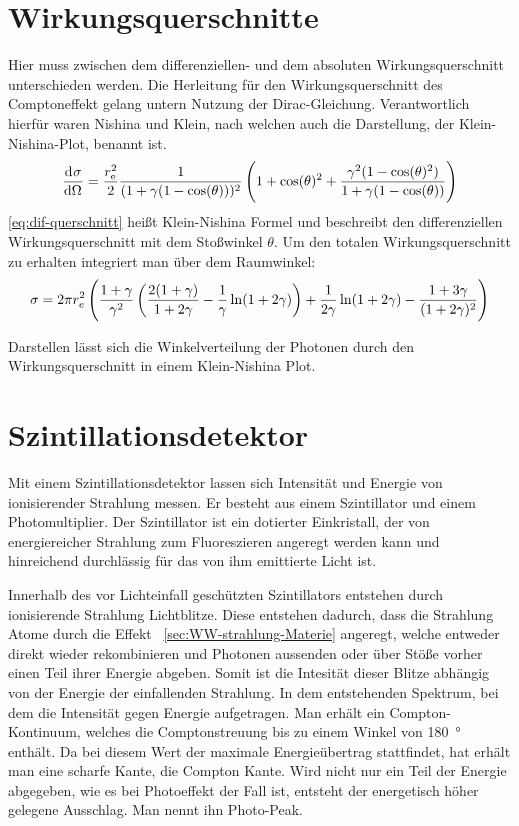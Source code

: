 \documentclass[11pt, ngerman, fleqn, DIV=15, headinclude, BCOR=2cm]{scrreprt}
\begin{document}
\section{Wirkungsquerschnitte}
Hier muss zwischen dem differenziellen- und dem absoluten Wirkungsquerschnitt
unterschieden werden.
Die Herleitung für den Wirkungsquerschnitt des Comptoneffekt gelang untern
Nutzung der Dirac-Gleichung. Verantwortlich hierfür waren Nishina und
Klein, nach welchen auch die Darstellung, der Klein-Nishina-Plot, benannt ist.
\[
    \dod \sigma\Omega = \frac{r^2_\text{e}}{2}
    \frac{1}{(1+\gamma(1-\cos(\theta)))^2}\del{1+\cos(\theta)^2+\frac{\gamma^2(1-\cos(\theta)^2)}{1+\gamma(1-\cos(\theta))}}
\]
\label{eq:dif-querschnitt}
\ref{eq:dif-querschnitt} heißt Klein-Nishina Formel und beschreibt den
differenziellen Wirkungsquerschnitt mit dem Stoßwinkel $\theta$.
Um den totalen Wirkungsquerschnitt zu erhalten integriert man über dem
Raumwinkel:
\[
    \sigma = 2\pi r^2_e
    \del{\frac{1+\gamma}{\gamma^2}\del{\frac{2(1+\gamma)}{1+2\gamma}-\frac
        1\gamma\ln(1+2\gamma)}+\frac
    1{2\gamma}\ln(1+2\gamma)-\frac{1+3\gamma}{(1+2\gamma)^2}}
\]

Darstellen lässt sich die Winkelverteilung der Photonen durch den Wirkungsquerschnitt in einem
Klein-Nishina Plot. 

\section{Szintillationsdetektor}
Mit einem Szintillationsdetektor lassen sich Intensität und Energie von
ionisierender Strahlung messen.
Er besteht aus einem Szintillator und einem Photomultiplier.
Der Szintillator ist ein dotierter Einkristall, der von energiereicher
Strahlung zum Fluoreszieren angeregt werden kann und hinreichend
durchlässig für das von ihm emittierte Licht ist.

Innerhalb des vor Lichteinfall geschützten Szintillators entstehen durch
ionisierende Strahlung Lichtblitze. 
Diese entstehen dadurch, dass die Strahlung Atome durch die Effekt
~\ref{sec:WW-strahlung-Materie} angeregt, welche entweder direkt
wieder rekombinieren und Photonen aussenden oder über Stöße vorher einen Teil
ihrer Energie abgeben.
Somit ist die Intesität dieser Blitze abhängig von der Energie der einfallenden Strahlung.
In dem entstehenden Spektrum, bei dem die Intensität gegen Energie
aufgetragen. Man erhält ein Compton-Kontinuum, welches die Comptonstreuung bis
zu einem Winkel von \SI{180}{\degree} enthält. Da bei diesem Wert der maximale
Energieübertrag stattfindet, hat erhält man eine scharfe Kante, die Compton
Kante. Wird nicht nur ein Teil der Energie abgegeben, wie es bei Photoeffekt
der Fall ist, entsteht der energetisch höher gelegene Ausschlag. Man nennt
ihn Photo-Peak.
\end{document}
